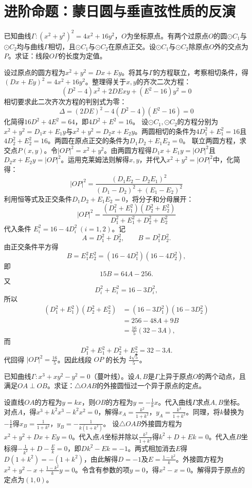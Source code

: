 \section{进阶命题：蒙日圆与垂直弦性质的反演}

\begin{example}
已知曲线$\Gamma: (x^2 + y^2)^2 = 4x^2 + 16y^2$，$O$为坐标原点。有两个过原点$O$的圆$\odot C_1$与$\odot C_2$均与曲线$\Gamma$相切，且$\odot C_1$与$\odot C_2$在原点正交。设$\odot C_1$与$\odot C_2$除原点$O$外的交点为$P$。求证：线段$OP$的长度为定值。
\end{example}
\begin{solution}
设过原点的圆方程为$x^2 + y^2 = Dx + Ey$。将其与$\Gamma$的方程联立，考察相切条件，得$(Dx + Ey)^2 = 4x^2 + 16y^2$。整理得关于$x,y$的齐次二次方程：
$$(D^2 - 4)x^2 + 2DExy + (E^2 - 16)y^2 = 0$$
相切要求此二次齐次方程的判别式为零：
$$\Delta = (2DE)^2 - 4(D^2 - 4)(E^2 - 16) = 0$$
化简得$16D^2 + 4E^2 = 64$，即$4D^2 + E^2 = 16$。
设$\odot C_1, \odot C_2$的方程分别为$x^2 + y^2 = D_1x + E_1y$与$x^2 + y^2 = D_2x + E_2y$。两圆相切的条件为$4D_1^2 + E_1^2 = 16$且$4D_2^2 + E_2^2 = 16$。两圆在原点正交的条件为$D_1D_2 + E_1E_2 = 0$。
联立两圆方程，求交点$P(x,y)$。令$|OP|^2 = x^2 + y^2$。由两圆方程得$D_1x + E_1y = |OP|^2$且$D_2x + E_2y = |OP|^2$。运用克莱姆法则解得$x, y$，并代入$x^2 + y^2 = |OP|^2$中，化简得：
$$|OP|^2 = \frac{(D_1E_2 - D_2E_1)^2}{(D_1 - D_2)^2 + (E_1 - E_2)^2}$$
利用恒等式及正交条件$D_1D_2 + E_1E_2 = 0$，将分子和分母展开：
$$|OP|^2 = \frac{(D_1^2 + E_1^2)(D_2^2 + E_2^2)}{D_1^2 + E_1^2 + D_2^2 + E_2^2}$$
代入条件 $E_i^2=16-4D_i^2\ (i=1,2)$。记
\[
A=D_1^2+D_2^2,\qquad B=D_1^2D_2^2.
\]
由正交条件平方得
\[
B=E_1^2E_2^2=(16-4D_1^2)(16-4D_2^2),
\]
即
\[
15B=64A-256.
\]
又
\[
D_i^2+E_i^2=16-3D_i^2,
\]
所以
\[
\begin{aligned}
(D_1^2+E_1^2)(D_2^2+E_2^2)
&=(16-3D_1^2)(16-3D_2^2)\\
&=256-48A+9B\\
&=\frac{16}{5}(32-3A),
\end{aligned}
\]
而
\[
D_1^2+E_1^2+D_2^2+E_2^2=32-3A.
\]
代回得 $|OP|^2=\frac{16}{5}$。因此线段 $OP$ 的长为 $\frac{4\sqrt5}{5}$。
\end{solution}

\begin{example}
已知曲线$\Gamma: x^3 + xy^2 - y^2 = 0$（蔓叶线）。设$A, B$是$\Gamma$上异于原点$O$的两个动点，且满足$OA \perp OB$。求证：$\triangle OAB$的外接圆恒过一个异于原点的定点。
\end{example}
\begin{solution}
设直线$OA$的方程为$y = kx$，则$OB$的方程为$y = -\frac{1}{k}x$。代入曲线$\Gamma$求点$A, B$坐标。对点$A$，得$x^3 + k^2x^3 - k^2x^2 = 0$，解得$x_A = \frac{k^2}{1+k^2}$，$y_A = \frac{k^3}{1+k^2}$。同理，将$k$替换为$-\frac{1}{k}$得$x_B = \frac{1}{1+k^2}$，$y_B = -\frac{1}{k(1+k^2)}$。
设$\triangle OAB$外接圆方程为$x^2 + y^2 + Dx + Ey = 0$。代入点$A$坐标并除以$\frac{k^2}{1+k^2}$得$k^2 + D + Ek = 0$。代入点$B$坐标得$-\frac{1}{k^2} + D - \frac{E}{k} = 0$，即$Dk^2 - Ek = -1$。两式相加消去$E$得$D(1+k^2) = -(1+k^2)$，由此解得$D=-1$及$E=\frac{1-k^2}{k}$。外接圆方程为$x^2 + y^2 - x + \frac{1-k^2}{k}y = 0$。令含有参数的项$y=0$，得$x^2 - x = 0$。解得异于原点的定点为$(1, 0)$。
\end{solution}


